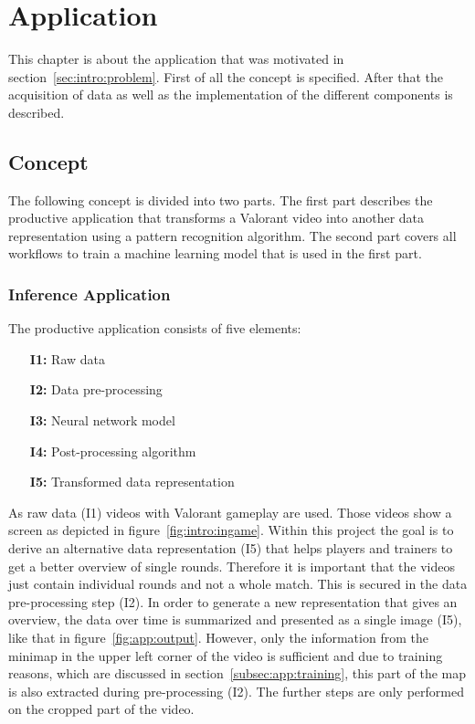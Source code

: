 \chapter{Application}\label{chpt:application}
\glsresetall

This chapter is about the application that was motivated in section~\ref{sec:intro:problem}. First of 
all the concept is specified. After that the acquisition of data as well as the implementation of the 
different components is described.

\section{Concept}\label{sec:app:concept}

The following concept is divided into two parts. The first part describes the productive application 
that transforms a Valorant video into another data representation using a pattern recognition 
algorithm. The second part covers all workflows to train a machine learning model that is used in the 
first part.

\subsection{Inference Application}\label{subsec:app:inference}

The productive application consists of five elements:

\begin{itemize}
	\item[\textbf{I1:}] Raw data
	\item[\textbf{I2:}] Data pre-processing
	\item[\textbf{I3:}] Neural network model
	\item[\textbf{I4:}] Post-processing algorithm
	\item[\textbf{I5:}] Transformed data representation
\end{itemize}

As raw data (I1) videos with Valorant gameplay are used. Those videos show a screen as depicted in 
figure~\ref{fig:intro:ingame}. Within this project the goal is to derive an alternative data 
representation (I5) that helps players and trainers to get a better overview of single rounds. 
Therefore it is important that the videos just contain individual rounds and not a whole match. This is 
secured in the data pre-processing step (I2). In order to generate a new representation that gives an 
overview, the data over time is summarized and presented as a single image (I5), like that in 
figure~\ref{fig:app:output}. However, only the information from the minimap in the upper left corner 
of the video is sufficient and due to training reasons, which are discussed in 
section~\ref{subsec:app:training}, this part of the map is also extracted during pre-processing (I2). 
The further steps are only performed on the cropped part of the video.

